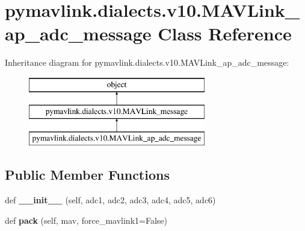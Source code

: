 \hypertarget{classpymavlink_1_1dialects_1_1v10_1_1MAVLink__ap__adc__message}{}\section{pymavlink.\+dialects.\+v10.\+M\+A\+V\+Link\+\_\+ap\+\_\+adc\+\_\+message Class Reference}
\label{classpymavlink_1_1dialects_1_1v10_1_1MAVLink__ap__adc__message}
Inheritance diagram for pymavlink.\+dialects.\+v10.\+M\+A\+V\+Link\+\_\+ap\+\_\+adc\+\_\+message\+:\begin{figure}[H]
\begin{center}
\leavevmode
\includegraphics[height=3.000000cm]{classpymavlink_1_1dialects_1_1v10_1_1MAVLink__ap__adc__message}
\end{center}
\end{figure}
\subsection*{Public Member Functions}
\begin{DoxyCompactItemize}
\item 
\mbox{\label{classpymavlink_1_1dialects_1_1v10_1_1MAVLink__ap__adc__message_a428f510e34e97270b1323252adf52789}} 
def {\bfseries \+\_\+\+\_\+init\+\_\+\+\_\+} (self, adc1, adc2, adc3, adc4, adc5, adc6)
\item 
\mbox{\label{classpymavlink_1_1dialects_1_1v10_1_1MAVLink__ap__adc__message_a4f23562ffab6c19024cfe7d5a9f9afd7}} 
def {\bfseries pack} (self, mav, force\+\_\+mavlink1=False)
\end{DoxyCompactItemize}
